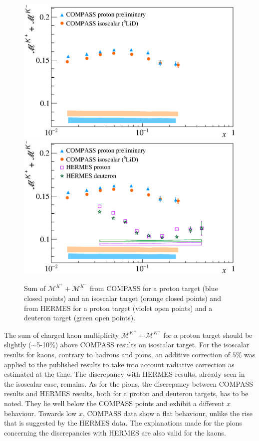 \begin{figure}[!h]
  \centering
	\includegraphics[scale=0.5]{./gfx/Mult_k_sum_noH.eps}
  \includegraphics[scale=0.5]{./gfx/Mult_k_sum.eps}
  \caption{Sum of $\mathscr{M}^{K^+}+\mathscr{M}^{K^-}$ from COMPASS for a proton target (blue closed points) and an isoscalar target (orange closed points) and from HERMES for a proton target (violet open points) and a deuteron target (green open points).}
  \label{pic:ksum}
\end{figure}

The sum of charged kaon multiplicity $\mathscr{M}^{K^+}+\mathscr{M}^{K^-}$ for a proton target should be slightly ($\sim$5-10\%) above COMPASS results on isoscalar target. For the isoscalar results for kaons, contrary to hadrons and pions, an additive correction of $5\%$ was applied to the published results to take into account radiative correction as estimated at the time. The discrepancy with HERMES results, already seen in the isoscalar case, remains. As for the pions, the discrepancy between COMPASS results and HERMES results, both for a proton and deuteron targets, has to be noted. They lie well below the COMPASS points and exhibit a different $x$ behaviour. Towards low $x$, COMPASS data show a flat behaviour, unlike the rise that is suggested by the HERMES data. The explanations made for the pions concerning the discrepancies with HERMES are also valid for the kaons.


